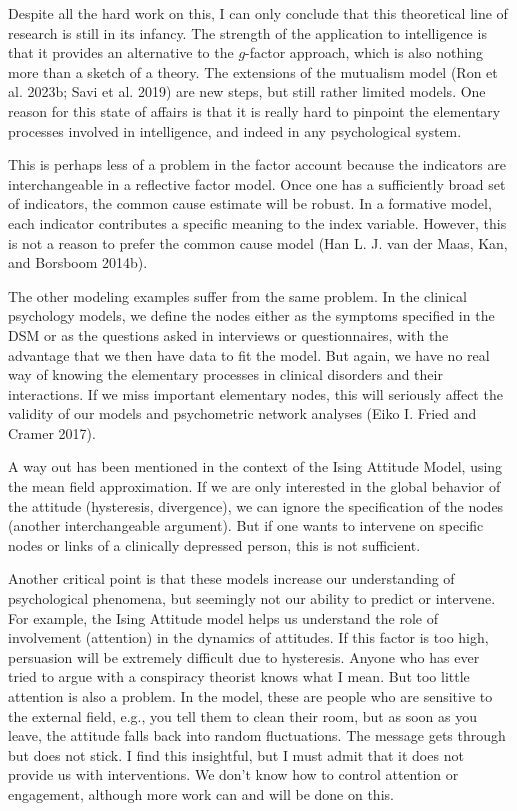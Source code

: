 \documentclass[
  a4paper,
  DIV=11,
  numbers=noendperiod,
  oneside]{scrreprt}
\begin{document}
Despite all the hard work on this, I can only conclude that this
theoretical line of research is still in its infancy. The strength of
the application to intelligence is that it provides an alternative to
the \(g\)-factor approach, which is also nothing more than a sketch of a
theory. The extensions of the mutualism model (Ron et al. 2023b; Savi et
al. 2019) are new steps, but still rather limited models. One reason for
this state of affairs is that it is really hard to pinpoint the
elementary processes involved in intelligence, and indeed in any
psychological system.

This is perhaps less of a problem in the factor account because the
indicators are interchangeable in a reflective factor model. Once one
has a sufficiently broad set of indicators, the common cause estimate
will be robust. In a formative model, each indicator contributes a
specific meaning to the index variable. However, this is not a reason to
prefer the common cause model (Han L. J. van der Maas, Kan, and Borsboom
2014b).

The other modeling examples suffer from the same problem. In the
clinical psychology models, we define the nodes either as the symptoms
specified in the DSM or as the questions asked in interviews or
questionnaires, with the advantage that we then have data to fit the
model. But again, we have no real way of knowing the elementary
processes in clinical disorders and their interactions. If we miss
important elementary nodes, this will seriously affect the validity of
our models and psychometric network analyses (Eiko I. Fried and Cramer
2017).

A way out has been mentioned in the context of the Ising Attitude Model,
using the mean field approximation. If we are only interested in the
global behavior of the attitude (hysteresis, divergence), we can ignore
the specification of the nodes (another interchangeable argument). But
if one wants to intervene on specific nodes or links of a clinically
depressed person, this is not sufficient.

Another critical point is that these models increase our understanding
of psychological phenomena, but seemingly not our ability to predict or
intervene. For example, the Ising Attitude model helps us understand the
role of involvement (attention) in the dynamics of attitudes. If this
factor is too high, persuasion will be extremely difficult due to
hysteresis. Anyone who has ever tried to argue with a conspiracy
theorist knows what I mean. But too little attention is also a problem.
In the model, these are people who are sensitive to the external field,
e.g., you tell them to clean their room, but as soon as you leave, the
attitude falls back into random fluctuations. The message gets through
but does not stick. I find this insightful, but I must admit that it
does not provide us with interventions. We don't know how to control
attention or engagement, although more work can and will be done on
this.
\end{document}
